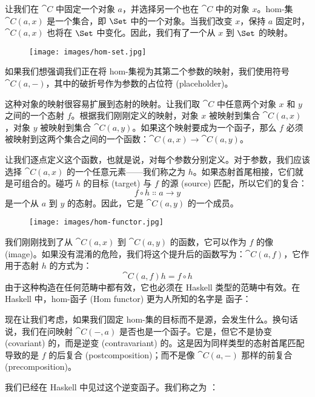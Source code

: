 让我们在 $\cat{C}$ 中固定一个对象 $a$，并选择另一个也在 $\cat{C}$ 中的对象 $x$。hom-集 $\cat{C}(a, x)$ 是一个集合，即 $\Set$ 中的一个对象。当我们改变 $x$，保持 $a$ 固定时，$\cat{C}(a, x)$ 也将在 $\Set$ 中变化。因此，我们有了一个从 $x$ 到 $\Set$ 的映射。

\begin{figure}[H]
  \centering
  \texttt{[image: images/hom-set.jpg]}
\end{figure}

\noindent
如果我们想强调我们正在将 hom-集视为其第二个参数的映射，我们使用符号 $\cat{C}(a, -)$，其中的破折号作为参数的占位符 (placeholder)。

这种对象的映射很容易扩展到态射的映射。让我们取 $\cat{C}$ 中任意两个对象 $x$ 和 $y$ 之间的一个态射 $f$。根据我们刚刚定义的映射，对象 $x$ 被映射到集合 $\cat{C}(a, x)$，对象 $y$ 被映射到集合 $\cat{C}(a, y)$。如果这个映射要成为一个函子，那么 $f$ 必须被映射到这两个集合之间的一个函数：$\cat{C}(a, x) \to \cat{C}(a, y)$。

让我们逐点定义这个函数，也就是说，对每个参数分别定义。对于参数，我们应该选择 $\cat{C}(a, x)$ 的一个任意元素——我们称之为 $h$。如果态射首尾相接，它们就是可组合的。碰巧 $h$ 的目标 (target) 与 $f$ 的源 (source) 匹配，所以它们的复合：
\[f \circ h \Colon a \to y\]
是一个从 $a$ 到 $y$ 的态射。因此，它是 $\cat{C}(a, y)$ 的一个成员。

\begin{figure}[H]
  \centering
  \texttt{[image: images/hom-functor.jpg]}
\end{figure}

\noindent
我们刚刚找到了从 $\cat{C}(a, x)$ 到 $\cat{C}(a, y)$ 的函数，它可以作为 $f$ 的像 (image)。如果没有混淆的危险，我们将这个提升后的函数写为：$\cat{C}(a, f)$，它作用于态射 $h$ 的方式为：
\[\cat{C}(a, f) h = f \circ h\]
由于这种构造在任何范畴中都有效，它也必须在 Haskell 类型的范畴中有效。在 Haskell 中，hom-函子 (Hom functor) 更为人所知的名字是  函子：


现在让我们考虑，如果我们固定 hom-集的目标而不是源，会发生什么。换句话说，我们在问映射 $\cat{C}(-, a)$ 是否也是一个函子。它是，但它不是协变 (covariant) 的，而是逆变 (contravariant) 的。这是因为同样类型的态射首尾匹配导致的是 $f$ 的后复合 (postcomposition)；而不是像 $\cat{C}(a, -)$ 那样的前复合 (precomposition)。

我们已经在 Haskell 中见过这个逆变函子。我们称之为 ：


